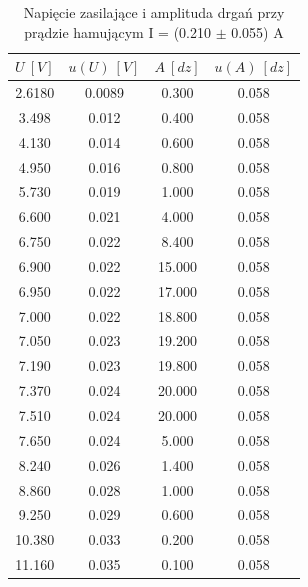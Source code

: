 \documentclass[12pt, a4paper, oneside]{article}
\begin{document}
\begin{table}[h]
  \centering
  \caption{Napięcie zasilające i amplituda drgań przy prądzie hamującym I = (0.210 $\pm$ 0.055) A}
    \begin{tabular}{|c|c|c|c|}\hline
    $U~[V]$ & $u(U)~[V]$ & $A~[dz]$ & $u(A)~[dz]$ \\\hline
    2.6180 & 0.0089 & 0.300 & 0.058 \\\hline
    3.498 & 0.012 & 0.400 & 0.058 \\\hline
    4.130 & 0.014 & 0.600 & 0.058 \\\hline
    4.950 & 0.016 & 0.800 & 0.058 \\\hline
    5.730 & 0.019 & 1.000 & 0.058 \\\hline
    6.600 & 0.021 & 4.000 & 0.058 \\\hline
    6.750 & 0.022 & 8.400 & 0.058 \\\hline
    6.900 & 0.022 & 15.000 & 0.058 \\\hline
    6.950 & 0.022 & 17.000 & 0.058 \\\hline
    7.000 & 0.022 & 18.800 & 0.058 \\\hline
    7.050 & 0.023 & 19.200 & 0.058 \\\hline
    7.190 & 0.023 & 19.800 & 0.058 \\\hline
    7.370 & 0.024 & 20.000 & 0.058 \\\hline
    7.510 & 0.024 & 20.000 & 0.058 \\\hline
    7.650 & 0.024 & 5.000 & 0.058 \\\hline
    8.240 & 0.026 & 1.400 & 0.058 \\\hline
    8.860 & 0.028 & 1.000 & 0.058 \\\hline
    9.250 & 0.029 & 0.600 & 0.058 \\\hline
    10.380 & 0.033 & 0.200 & 0.058 \\\hline
    11.160 & 0.035 & 0.100 & 0.058 \\\hline
    \end{tabular}%
  \label{tab:addlabel}%
\end{table}%
\end{document}
